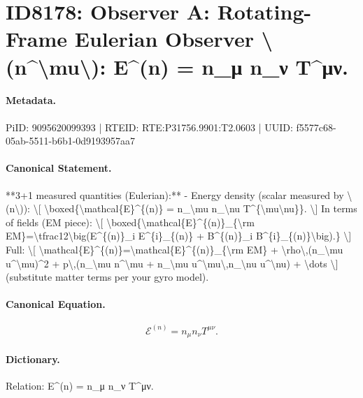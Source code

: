 \section*{ID8178: Observer A: Rotating-Frame Eulerian Observer \textbackslash{}(n\textasciicircum{}\textbackslash{}mu\textbackslash{}): E\textasciicircum{}(n) = n\_μ n\_ν T\textasciicircum{}μν.}
\paragraph{Metadata.}
PiID: 9095620099393 | RTEID: RTE:P31756.9901:T2.0603 | UUID: f5577c68-05ab-5511-b6b1-0d9193957aa7

\paragraph{Canonical Statement.}
**3+1 measured quantities (Eulerian):** - Energy density (scalar measured by \textbackslash{}(n\textbackslash{})): \textbackslash{}[ \textbackslash{}boxed\{\textbackslash{}mathcal\{E\}\textasciicircum{}\{(n)\} = n\_\textbackslash{}mu n\_\textbackslash{}nu T\textasciicircum{}\{\textbackslash{}mu\textbackslash{}nu\}\}. \textbackslash{}] In terms of fields (EM piece): \textbackslash{}[ \textbackslash{}boxed\{\textbackslash{}mathcal\{E\}\textasciicircum{}\{(n)\}\_\{\textbackslash{}rm EM\}=\textbackslash{}tfrac12\textbackslash{}big(E\textasciicircum{}\{(n)\}\_i E\textasciicircum{}\{i\}\_\{(n)\} + B\textasciicircum{}\{(n)\}\_i B\textasciicircum{}\{i\}\_\{(n)\}\textbackslash{}big).\} \textbackslash{}] Full: \textbackslash{}[ \textbackslash{}mathcal\{E\}\textasciicircum{}\{(n)\}=\textbackslash{}mathcal\{E\}\textasciicircum{}\{(n)\}\_\{\textbackslash{}rm EM\} + \textbackslash{}rho\textbackslash{},(n\_\textbackslash{}mu u\textasciicircum{}\textbackslash{}mu)\textasciicircum{}2 + p\textbackslash{},(n\_\textbackslash{}mu n\textasciicircum{}\textbackslash{}mu + n\_\textbackslash{}mu u\textasciicircum{}\textbackslash{}mu\textbackslash{},n\_\textbackslash{}nu u\textasciicircum{}\textbackslash{}nu) + \textbackslash{}dots \textbackslash{}] (substitute matter terms per your gyro model).

\paragraph{Canonical Equation.}
\[
\boxed{\mathcal{E}^{(n)} = n_\mu n_\nu T^{\mu\nu}}.
\]

\paragraph{Dictionary.}
Relation: E\textasciicircum{}(n) = n\_μ n\_ν T\textasciicircum{}μν.

